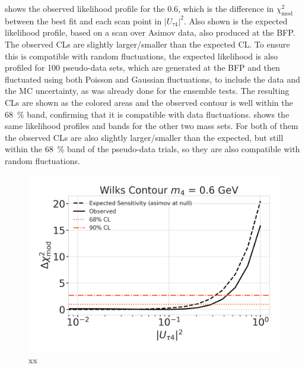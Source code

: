  shows the observed likelihood profile for the \SI{0.6}{\gev}, which is the difference in $\chi^2_{\mathrm{mod}}$ between the best fit and each scan point in $|U_{\tau4}|^2$. Also shown is the expected likelihood profile, based on a scan over Asimov data, also produced at the BFP. The observed CLs are slightly larger/smaller than the expected CL. To ensure this is compatible with random fluctuations, the expected likelihood is also profiled for 100 pseudo-data sets, which are generated at the BFP and then fluctuated using both Poisson and Gaussian fluctuations, to include the data and the MC uncertainty, as was already done for the ensemble tests. The resulting CLs are shown as the colored areas and the observed contour is well within the \SI{68}{\percent} band, confirming that it is compatible with data fluctuations.  shows the same likelihood profiles and bands for the other two mass sets. For both of them the observed CLs are also slightly larger/smaller than the expected, but still within the \SI{68}{\percent} band of the pseudo-data trials, so they are also compatible with random fluctuations.

\begin{figure}[h]
    \includegraphics{figures/results/best_fit/sensitivity_and_wilks_scan_0.6_GeV_with_1sigma.png}
	\caption[xx]{xx}
\end{figure}


